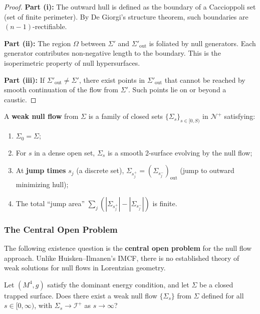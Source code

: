 \begin{proof}
\textbf{Part (i):} The outward hull is defined as the boundary of a Caccioppoli set (set of finite perimeter). By De Giorgi's structure theorem, such boundaries are $(n-1)$-rectifiable.

\textbf{Part (ii):} The region $\Omega$ between $\Sigma'$ and $\Sigma'_{\mathrm{out}}$ is foliated by null generators. Each generator contributes non-negative length to the boundary. This is the isoperimetric property of null hypersurfaces.

\textbf{Part (iii):} If $\Sigma'_{\mathrm{out}} \neq \Sigma'$, there exist points in $\Sigma'_{\mathrm{out}}$ that cannot be reached by smooth continuation of the flow from $\Sigma'$. Such points lie on or beyond a caustic.
\end{proof}

\begin{definition}
\label{def:weak-null-flow}
A \textbf{weak null flow} from $\Sigma$ is a family of closed sets $\{\Sigma_s\}_{s \in [0, S)}$ in $\mathcal{N}^+$ satisfying:
\begin{enumerate}[label=\textbf{(W\arabic*)}]
\item $\Sigma_0 = \Sigma$;
\item For $s$ in a dense open set, $\Sigma_s$ is a smooth 2-surface evolving by the null flow;
\item At \textbf{jump times} $s_j$ (a discrete set), $\Sigma_{s_j^+} = (\Sigma_{s_j^-})_{\text{out}}$ (jump to outward minimizing hull);
\item The total ``jump area'' $\sum_j (|\Sigma_{s_j^+}| - |\Sigma_{s_j^-}|)$ is finite.
\end{enumerate}
\end{definition}

\subsubsection{The Central Open Problem}

\begin{remark}
The following existence question is the \textbf{central open problem} for the null flow approach. Unlike Huisken--Ilmanen's IMCF, there is no established theory of weak solutions for null flows in Lorentzian geometry.
\end{remark}

\begin{openproblem}
\label{prob:weak-null-flow-existence}
\label{conj:weak-null-flow-existence}
Let $(M^4, g)$ satisfy the dominant energy condition, and let $\Sigma$ be a closed trapped surface. Does there exist a weak null flow $\{\Sigma_s\}$ from $\Sigma$ defined for all $s \in [0, \infty)$, with $\Sigma_s \to \mathscr{I}^+$ as $s \to \infty$?
\end{openproblem}

